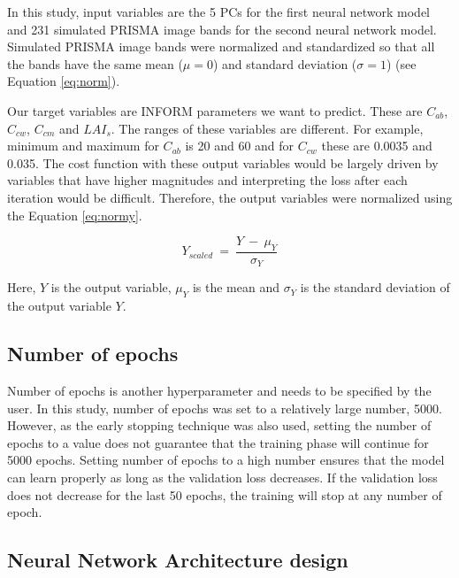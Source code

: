 \documentclass[a4paper, twoside]{templates/ociamthesis}
\begin{document}
In this study, input variables are the 5 PCs for the first neural network model and 231 simulated PRISMA image bands for the second neural network model. Simulated PRISMA image bands were normalized and standardized so that all the bands have the same mean (\(\mu = 0\)) and standard deviation (\(\sigma = 1\)) (see Equation \eqref{eq:norm}).

Our target variables are INFORM parameters we want to predict. These are \(C_{ab}\), \(C_{cw}\), \(C_{cm}\) and \(LAI_{s}\). The ranges of these variables are different. For example, minimum and maximum for \(C_{ab}\) is 20 and 60 and for \(C_{cw}\) these are 0.0035 and 0.035. The cost function with these output variables would be largely driven by variables that have higher magnitudes and interpreting the loss after each iteration would be difficult. Therefore, the output variables were normalized using the Equation \eqref{eq:normy}.

\begin{equation}
Y_{scaled}\ =\ \frac{Y\ -\ \mu_{Y}}{\sigma_{Y}}
\label{eq:normy}
\end{equation}

Here, \(Y\) is the output variable, \(\mu_{Y}\) is the mean and \(\sigma_{Y}\) is the standard deviation of the output variable \(Y\).

\hypertarget{number-of-epochs}{%
\subsection{Number of epochs}\label{number-of-epochs}}

Number of epochs is another hyperparameter and needs to be specified by the user. In this study, number of epochs was set to a relatively large number, 5000. However, as the early stopping technique was also used, setting the number of epochs to a value does not guarantee that the training phase will continue for 5000 epochs. Setting number of epochs to a high number ensures that the model can learn properly as long as the validation loss decreases. If the validation loss does not decrease for the last 50 epochs, the training will stop at any number of epoch.

\hypertarget{neural-network-architecture-design}{%
\subsection{Neural Network Architecture design}\label{neural-network-architecture-design}}
\end{document}
